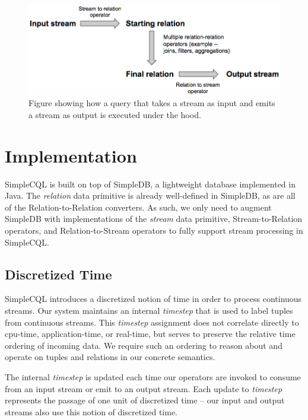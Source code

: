 \documentclass[a4paper, 10pt, conference]{IEEEconf}
\begin{document}
\begin{figure}[h!]
    \centering
    \centerline{\includegraphics[totalheight=2.5cm]{operators.png}}
    \caption{Figure showing how a query that takes a stream as input and emits a stream as output is executed under the hood.}
    \label{fig:operators}
\end{figure}


\section{Implementation}
SimpleCQL is built on top of SimpleDB, a lightweight database implemented in Java. The \textit{relation} data primitive is already well-defined in SimpleDB, as are all of the Relation-to-Relation converters. As such, we only need to augment SimpleDB with implementations of the \textit{stream} data primitive, Stream-to-Relation operators, and Relation-to-Stream operators to fully support stream processing in SimpleCQL. 

\subsection*{Discretized Time}
SimpleCQL introduces a discretized notion of time in order to process continuous streams. Our system maintains an internal \textit{timestep} that is used to label tuples from continuous streams. This \textit{timestep} assignment does not correlate directly to cpu-time, application-time, or real-time, but serves to preserve the relative time ordering of incoming data. We require such an ordering to reason about and operate on tuples and relations in our concrete semantics.

The internal \textit{timestep} is updated each time our operators are invoked to consume from an input stream or emit to an output stream. Each update to \textit{timestep} represents the passage of one unit of discretized time -- our input and output streams also use this notion of discretized time. 
\end{document}
